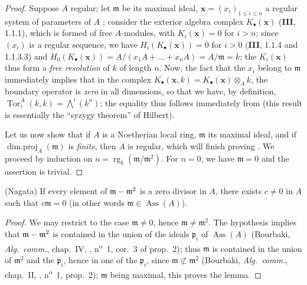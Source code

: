 \begin{proof}
Suppose $A$ regular;
let $\mathfrak{m}$ be its maximal ideal, $\mathbf{x}=(x_i)_{1\leq i\leq n}$ a regular system of parameters of $A$ ;
consider the exterior algebra complex $K_\bullet(\mathbf{x})$ (\textbf{III}, 1.1.1), which is formed of free $A$-modules, with $K_i(\mathbf{x})=0$ for $i>n$;
since $(x_i)$ is a regular sequence, we have $H_i(K_\bullet(\mathbf{x}))=0$ for $i>0$ (\textbf{III}, 1.1.4 and 1.1.3.3) and $H_0(K_\bullet(\mathbf{x}))=A/(x_1 A+\ldots+x_n A)=A/\mathfrak{m}=k$;
the $K_i(\mathbf{x})$ thus form a \emph{free resolution} of $k$ of length $n$.
Now, the fact that the $x_i$ belong to $\mathfrak{m}$ immediately implies that in the complex $K_\bullet(\mathbf{x},k)=K_\bullet(\mathbf{x})\otimes_A k$, the boundary operator is \emph{zero} in all dimensions, so that we have, by definition, $\operatorname{Tor}^A_i(k,k)=\textstyle\bigwedge^i(k^n)$;
the equality  thus follows immediately from  (this result is essentially the ``syzygy theorem'' of Hilbert).

Let us now show that if $A$ is a Noetherian local ring, $\mathfrak{m}$ its maximal ideal, and if $\operatorname{dim.proj}_A(\mathfrak{m})$ is \emph{finite}, then $A$ is regular, which will finish proving .
We proceed by induction on $n=\operatorname{rg}_k(\mathfrak{m}/\mathfrak{m}^2)$.
For $n=0$, we have $\mathfrak{m}=0$ and the assertion is trivial.
\end{proof}

\begin{lemma}[17.3.1.2]
\label{0.17.3.1.2}
\textnormal{(Nagata)}
If every element of $\mathfrak{m}-\mathfrak{m}^2$ is a zero divisor in $A$, there exists $c\neq 0$ in $A$ such that $c\mathfrak{m}=0$ (in other words $\mathfrak{m}\in\operatorname{Ass}(A)$).
\end{lemma}

\begin{proof}
We may restrict to the case $\mathfrak{m}\neq 0$, hence $\mathfrak{m}\neq\mathfrak{m}^2$.
The hypothesis implies that $\mathfrak{m}-\mathfrak{m}^2$ is contained in the union of the ideals $\mathfrak{p}_i$ of $\operatorname{Ass}(A)$ (Bourbaki, \emph{Alg.~comm.}, chap.~IV, , n\textsuperscript{o}~1, cor.~3 of prop.~2);
thus $\mathfrak{m}$ is contained in the union of $\mathfrak{m}^2$ and the $\mathfrak{p}_i$, hence in one of the $\mathfrak{p}_i$, since $\mathfrak{m}\not\subset\mathfrak{m}^2$ (Bourbaki, \emph{Alg.~comm.}, chap.~II, , n\textsuperscript{o}~1, prop.~2);
$\mathfrak{m}$ being maximal, this proves the lemma.
\end{proof}

